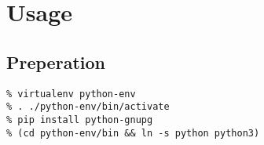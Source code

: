 \section{Usage}

\subsection{Preperation}
\begin{verbatim}
% virtualenv python-env
% . ./python-env/bin/activate
% pip install python-gnupg
% (cd python-env/bin && ln -s python python3)
\end{verbatim}

